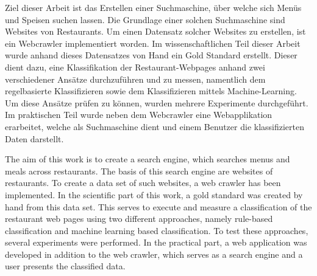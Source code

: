 Ziel dieser Arbeit ist das Erstellen einer Suchmaschine, über welche sich Menüs und Speisen suchen lassen.
Die Grundlage einer solchen Suchmaschine sind Websites von Restaurants.
Um einen Datensatz solcher Websites zu erstellen, ist ein Webcrawler implementiert worden.
Im wissenschaftlichen Teil dieser Arbeit wurde anhand dieses Datensatzes von Hand ein Gold Standard erstellt.
Dieser dient dazu, eine Klassifikation der Restaurant-Webpages anhand zwei verschiedener Ansätze durchzuführen und zu messen, namentlich dem regelbasierte Klassifizieren sowie dem Klassifizieren mittels Machine-Learning.
Um diese Ansätze prüfen zu können, wurden mehrere Experimente durchgeführt.
Im praktischen Teil wurde neben dem Webcrawler eine Webapplikation erarbeitet, welche als Suchmaschine dient und einem Benutzer die klassifizierten Daten darstellt.

The aim of this work is to create a search engine, which searches menus and meals across restaurants.
The basis of this search engine are websites of restaurants.
To create a data set of such websites, a web crawler has been implemented.
In the scientific part of this work, a gold standard was created by hand from this data set.
This serves to execute and measure a classification of the restaurant web pages using two different approaches, namely rule-based classification and machine learning based classification.
To test these approaches, several experiments were performed.
In the practical part, a web application was developed in addition to the web crawler, which serves as a search engine and a user presents the classified data.